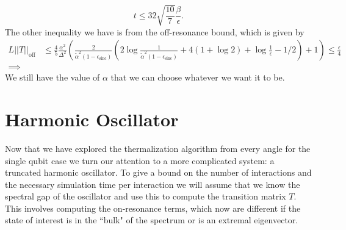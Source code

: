 \documentclass{article}
\newcommand{\off}{\text{off}}
\newcommand{\norm}[1]{\left| \left| #1 \right| \right|}
\DeclareMathOperator{\sinc}{sinc}
\begin{document}
\begin{equation}
    t \le 32 \sqrt{\frac{10}{7}} \frac{\beta}{\epsilon}.
\end{equation}
The other inequality we have is from the off-resonance bound, which is given by
\begin{align}
    L \norm{T}_{\off} &\le \frac{4}{5} \frac{\alpha^2}{\Delta^2} \left( \frac{2}{\widetilde{\alpha}^2 (1 - \epsilon_{\sinc})} \left( 2 \log \frac{1}{\widetilde{\alpha}^2 (1 - \epsilon_{\sinc})} + 4(1 + \log 2) +  \log \frac{1}{\epsilon} - 1/2 \right) + 1 \right) \le \frac{\epsilon}{4} \\
    \implies 
\end{align}
We still have the value of $\alpha$ that we can choose whatever we want it to be. 

\section{Harmonic Oscillator}
Now that we have explored the thermalization algorithm from every angle for the single qubit case we turn our attention to a more complicated system: a truncated harmonic oscillator. To give a bound on the number of interactions and the necessary simulation time per interaction we will assume that we know the spectral gap of the oscillator and use this to compute the transition matrix $T$. This involves computing the on-resonance terms, which now are different if the state of interest is in the ``bulk" of the spectrum or is an extremal eigenvector. 
\end{document}
